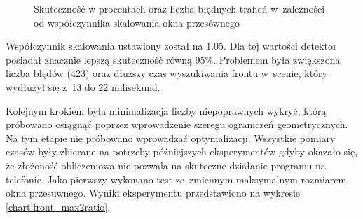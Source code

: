 \begin{figure}[h!]
	\centering
	\begin{subfigure}{.49\linewidth}\centering
	\end{subfigure}
	\hfill
	\begin{subfigure}{.49\linewidth}\centering
	\end{subfigure}
	\caption{Skuteczność w procentach oraz liczba błędnych trafień 
		w~zależności od współczynnika skalowania okna przesównego}
	\label{chart:scale_factor2hitratio}
\end{figure}

Współczynnik skalowania ustawiony został na 1.05. Dla tej wartości
detektor posiadał znacznie lepszą skuteczność równą 95\%. Problemem była 
zwiększona liczba błędów (423) oraz dłuższy czas wyszukiwania frontu w~scenie, 
który wydłużył się z~13 do 22 milisekund.

Kolejnym krokiem była minimalizacja liczby niepoprawnych wykryć, którą
próbowano osiągnąć poprzez wprowadzenie szeregu ograniczeń geometrycznych. 
Na tym etapie nie próbowano wprowadzać optymalizacji. Wszystkie 
pomiary czasów były zbierane na potrzeby późniejszych eksperymentów
gdyby okazało się, że złożoność obliczeniowa nie pozwala na skuteczne
działanie programu na telefonie.
Jako pierwszy wykonano test ze~zmiennym maksymalnym rozmiarem 
okna przesuwnego. Wyniki eksperymentu przedstawiono na wykresie
\ref{chart:front_max2ratio}.

